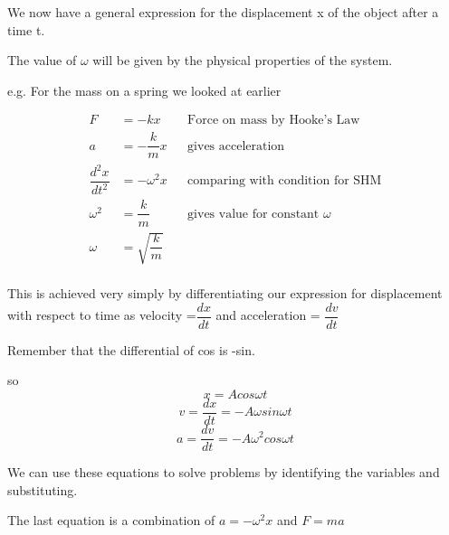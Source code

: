 \documentclass[revision-guide.tex]{subfiles}
\begin{document}
We now have a general expression for the displacement x of the object after a time t.

The value of $\omega$ will be given by the physical properties of the system.

e.g.
For the mass on a spring we looked at earlier

\begin{align*} 
F &= -kx && \text {Force on mass by Hooke's Law}\\
a &= -\dfrac{k}{m} x  && \text{gives acceleration}\\
\dfrac{d^2x}{dt^2} &= -\omega ^2 x && \text{comparing with condition for SHM} \\
\omega ^2 &= \dfrac{k}{m} && \text{gives value for constant } \omega \\
\omega &= \sqrt{\dfrac{k}{m}} \\
\end{align*}




This is achieved very simply by differentiating our expression for displacement with respect to time as velocity =$\dfrac{dx}{dt}$ and acceleration = $\dfrac{dv}{dt}$

Remember that the differential of cos is -sin.

so 
\[
x = A cos \omega t
\]
\[
v = \dfrac{dx}{dt}= -A \omega sin \omega t
\]
\[
a = \dfrac{dv}{dt}= -A \omega^2 cos \omega t
\]



We can use these equations to solve problems by identifying the variables and substituting.

The last equation is a combination of $a = -\omega^2 x$ and $F = ma$
\end{document}
